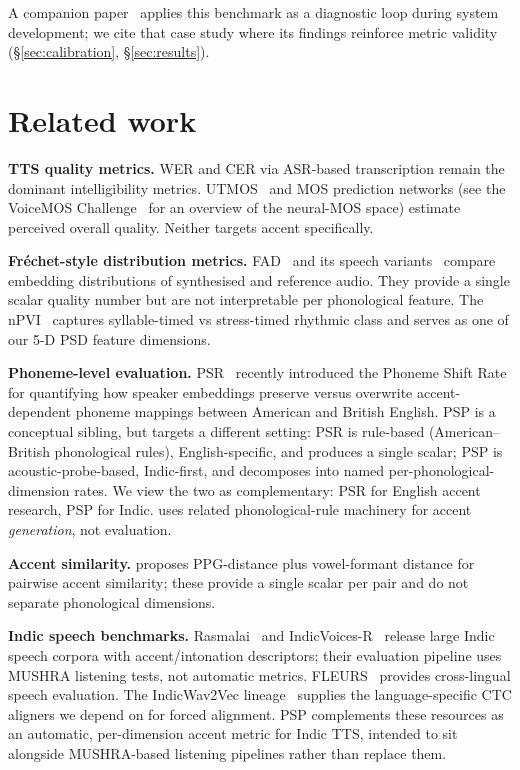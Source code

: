 \documentclass[conference,a4paper]{IEEEtran}
\newcommand{\psp}{\textsc{PSP}}
\begin{document}
A companion paper~\cite{praxy2026} applies this benchmark as a diagnostic loop during system development; we cite that case study where its findings reinforce metric validity (§\ref{sec:calibration}, §\ref{sec:results}).

\section{Related work}
\label{sec:related}

\textbf{TTS quality metrics.} WER and CER via ASR-based transcription remain the dominant intelligibility metrics. UTMOS~\cite{saeki2022utmos} and MOS prediction networks (see the VoiceMOS Challenge~\cite{huang2022voicemos} for an overview of the neural-MOS space) estimate perceived overall quality. Neither targets accent specifically.

\textbf{Fr\'echet-style distribution metrics.} FAD~\cite{kilgour2019fad} and its speech variants~\cite{fsd2026} compare embedding distributions of synthesised and reference audio. They provide a single scalar quality number but are not interpretable per phonological feature. The nPVI~\cite{grabe2002durational} captures syllable-timed vs stress-timed rhythmic class and serves as one of our 5-D PSD feature dimensions.

\textbf{Phoneme-level evaluation.} PSR~\cite{psr2026} recently introduced the Phoneme Shift Rate for quantifying how speaker embeddings preserve versus overwrite accent-dependent phoneme mappings between American and British English. \psp{} is a conceptual sibling, but targets a different setting: PSR is rule-based (American--British phonological rules), English-specific, and produces a single scalar; \psp{} is acoustic-probe-based, Indic-first, and decomposes into named per-phonological-dimension rates. We view the two as complementary: PSR for English accent research, \psp{} for Indic. \cite{l2accented2026} uses related phonological-rule machinery for accent \emph{generation}, not evaluation.

\textbf{Accent similarity.} \cite{accent_pairwise2025} proposes PPG-distance plus vowel-formant distance for pairwise accent similarity; these provide a single scalar per pair and do not separate phonological dimensions.

\textbf{Indic speech benchmarks.} Rasmalai~\cite{ai4bharat2023rasa} and IndicVoices-R~\cite{indicvoicesr2024} release large Indic speech corpora with accent/intonation descriptors; their evaluation pipeline uses MUSHRA listening tests, not automatic metrics. FLEURS~\cite{conneau2022fleurs} provides cross-lingual speech evaluation. The IndicWav2Vec lineage~\cite{javed2022indicwav2vec} supplies the language-specific CTC aligners we depend on for forced alignment. \psp{} complements these resources as an automatic, per-dimension accent metric for Indic TTS, intended to sit alongside MUSHRA-based listening pipelines rather than replace them.
\end{document}
